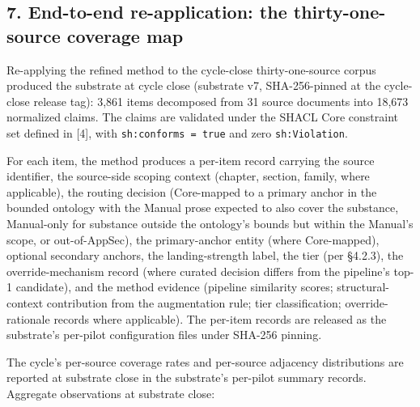 \documentclass[
]{article}
\begin{document}
\subsection{7. End-to-end re-application: the thirty-one-source coverage
map}\label{end-to-end-re-application-the-thirty-one-source-coverage-map}

Re-applying the refined method to the cycle-close thirty-one-source
corpus produced the substrate at cycle close (substrate v7,
SHA-256-pinned at the cycle-close release tag): 3,861 items decomposed
from 31 source documents into 18,673 normalized claims. The claims are
validated under the SHACL Core constraint set defined in {[}4{]}, with
\texttt{sh:conforms\ =\ true} and zero \texttt{sh:Violation}.

For each item, the method produces a per-item record carrying the source
identifier, the source-side scoping context (chapter, section, family,
where applicable), the routing decision (Core-mapped to a primary anchor
in the bounded ontology with the Manual prose expected to also cover the
substance, Manual-only for substance outside the ontology's bounds but
within the Manual's scope, or out-of-AppSec), the primary-anchor entity
(where Core-mapped), optional secondary anchors, the landing-strength
label, the tier (per §4.2.3), the override-mechanism record (where
curated decision differs from the pipeline's top-1 candidate), and the
method evidence (pipeline similarity scores; structural-context
contribution from the augmentation rule; tier classification;
override-rationale records where applicable). The per-item records are
released as the substrate's per-pilot configuration files under SHA-256
pinning.

The cycle's per-source coverage rates and per-source adjacency
distributions are reported at substrate close in the substrate's
per-pilot summary records. Aggregate observations at substrate close:
\end{document}
